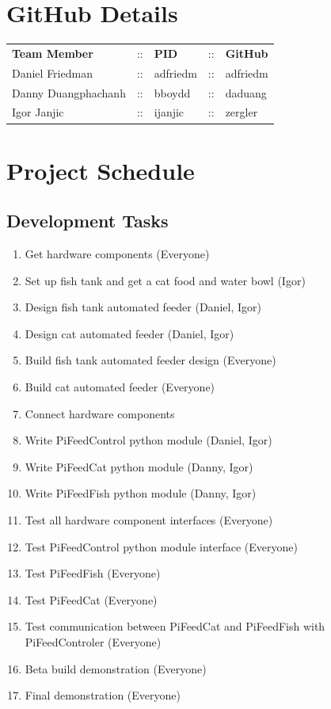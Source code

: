 \section{GitHub Details}
\begin{tabular}{ l c l c l}
    \textbf{Team Member} & :: & \textbf{PID} & :: & \textbf{GitHub} \\
    Daniel Friedman      & :: & adfriedm     & :: & adfriedm        \\
    Danny Duangphachanh  & :: & bboydd       & :: & daduang         \\
    Igor Janjic          & :: & ijanjic      & :: & zergler
\end{tabular}

\section{Project Schedule}

\subsection{Development Tasks}
\begin{enumerate}
    \item Get hardware components (Everyone)
    \item Set up fish tank and get a cat food and water bowl (Igor)
    \item Design fish tank automated feeder (Daniel, Igor)
    \item Design cat automated feeder (Daniel, Igor)
    \item Build fish tank automated feeder design (Everyone)
    \item Build cat automated feeder (Everyone)
    \item Connect hardware components
    \item Write PiFeedControl python module (Daniel, Igor)
    \item Write PiFeedCat python module (Danny, Igor)
    \item Write PiFeedFish python module (Danny, Igor)
    \item Test all hardware component interfaces (Everyone)
    \item Test PiFeedControl python module interface (Everyone)
    \item Test PiFeedFish (Everyone)
    \item Test PiFeedCat (Everyone)
    \item Test communication between PiFeedCat and PiFeedFish with
          PiFeedControler (Everyone)
    \item Beta build demonstration (Everyone)
    \item Final demonstration (Everyone)

\end{enumerate}

